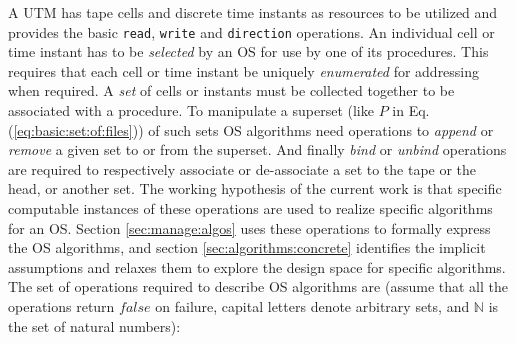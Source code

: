 \documentclass[draft]{article}
\begin{document}
A UTM  has tape cells  and discrete time  instants as resources  to be
utilized  and  provides the  basic  \texttt{read}, \texttt{write}  and
\texttt{direction} operations.  An individual cell or time instant has
to be \emph{selected} by an OS for use by one of its procedures.  This
requires that each cell  or time instant be uniquely \emph{enumerated}
for addressing when required.  A  \emph{set} of cells or instants must
be  collected  together  to   be  associated  with  a  procedure.   To
manipulate a  superset (like $P$  in Eq.(\ref{eq:basic:set:of:files}))
of  such  sets  OS  algorithms  need operations  to  \emph{append}  or
\emph{remove}  a given  set  to  or from  the  superset.  And  finally
\emph{bind} or  \emph{unbind} operations are  required to respectively
associate or  de-associate a set to  the tape or the  head, or another
set.   The working  hypothesis of  the current  work is  that specific
computable instances of these  operations are used to realize specific
algorithms  for  an  OS.   Section \ref{sec:manage:algos}  uses  these
operations  to  formally  express   the  OS  algorithms,  and  section
\ref{sec:algorithms:concrete} identifies  the implicit assumptions and
relaxes them to explore the design space for specific algorithms.  The
set of operations required to  describe OS algorithms are (assume that
all the  operations return $false$ on failure,  capital letters denote
arbitrary sets, and $\mathbb{N}$ is the set of natural numbers):
\end{document}
